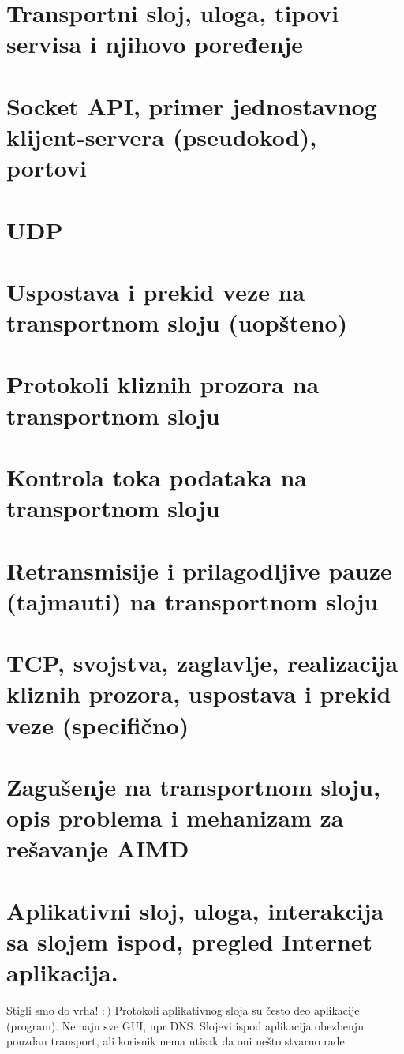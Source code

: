 \documentclass{article} %
\begin{document}
\section{Transportni sloj, uloga, tipovi servisa i njihovo poređenje}
\section{Socket API, primer jednostavnog klijent-servera (pseudokod), portovi}
\section{UDP}
\section{Uspostava i prekid veze na transportnom sloju (uopšteno)}
\section{Protokoli kliznih prozora na transportnom sloju}
\section{Kontrola toka podataka na transportnom sloju}
\section{Retransmisije i prilagodljive pauze (tajmauti) na transportnom sloju}
\section{TCP, svojstva, zaglavlje, realizacija kliznih prozora, uspostava i prekid veze (specifično)}
\section{Zagušenje na transportnom sloju, opis problema i mehanizam za rešavanje AIMD}
\section{Aplikativni sloj, uloga, interakcija sa slojem ispod, pregled Internet aplikacija.}


\noindent Stigli smo do vrha! $:)$ Protokoli aplikativnog sloja su \v cesto deo aplikacije (program). Nemaju sve GUI, npr DNS. Slojevi ispod aplikacija obezbe\dj uju pouzdan transport, ali korisnik nema utisak da oni ne\v sto stvarno rade.
\end{document}
